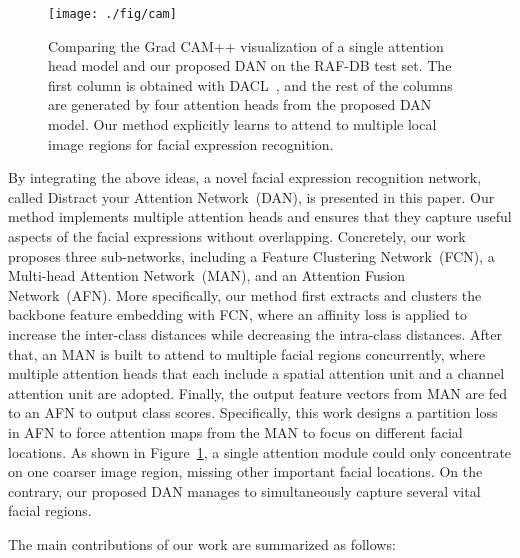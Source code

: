 \documentclass{article}
\begin{document}
\begin{figure}[]
\centering
\texttt{[image: ./fig/cam]}
\caption{{Comparing}  the Grad CAM++ visualization of a single attention head model and our proposed DAN on the RAF-DB test set. The first column is obtained with DACL~{\cite{farzaneh2021facial},}   and the rest of the columns are generated by four attention heads from the proposed DAN model. Our method explicitly learns to attend to multiple local image regions for facial expression recognition.}
\label{fig:cam}

\end{figure}

By integrating the above ideas, a novel facial expression recognition network, called Distract your Attention Network~(DAN), {is presented in this paper}. Our method implements multiple attention heads and ensures that they capture useful aspects of the facial expressions without overlapping. Concretely, {our work} proposes three sub-networks, including a Feature Clustering Network~(FCN), a Multi-head Attention Network~(MAN), and an Attention Fusion Network~(AFN). More specifically, {our method} first extracts and clusters the backbone feature embedding with FCN, where an affinity loss is applied to increase the inter-class distances while decreasing the intra-class distances. After that, an MAN is built to attend to multiple facial regions concurrently, where multiple attention heads that each include a spatial attention unit and a channel attention unit are adopted. Finally, {the output feature vectors from MAN} are fed to an AFN to output class scores. Specifically, this work designs a partition loss in AFN to force attention maps from the MAN to focus on different facial locations.
As shown in Figure~\ref{fig:cam}, a single attention module could only concentrate on one coarser image region, missing other important facial locations. On the contrary, our proposed DAN manages to simultaneously capture several vital facial regions.

The main contributions of our work are summarized as follows:
\end{document}
